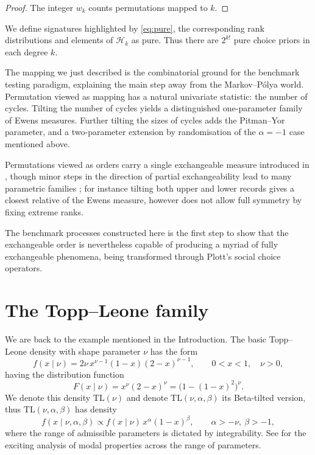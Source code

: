 \documentclass[11pt,reqno]{amsart}
\theoremstyle{definition}
\theoremstyle{remark}
\numberwithin{equation}{section}
\begin{document}
\begin{proof}
The integer \(w_k\) counts permutations mapped to \(k\).
\end{proof}

We define signatures highlighted by \eqref{eq:pure}, the corresponding rank distributions and elements of \(\mathcal{H}_k\) as pure. Thus there are \(2^{k!}\) pure choice priors in each degree \(k\).

The mapping we just described is the combinatorial ground for the benchmark testing paradigm, explaining the main step away from the Markov--P\'olya world. Permutation viewed as mapping has a natural univariate statistic: the number of cycles. Tilting the number of cycles yields a distinguished one-parameter family of Ewens measures. Further tilting the sizes of cycles adds the Pitman--Yor parameter, and a two-parameter extension by randomisation of the \(\alpha=-1\) case mentioned above.

Permutations viewed as orders carry a single exchangeable measure introduced in \cite{Rubin1966}, though minor steps in the direction of partial exchangeability lead to many parametric families \cite{Gnedin2010coherent,Gnedin2006constrained}; for instance tilting both upper and lower records gives a closest relative of the Ewens measure, however does not allow full symmetry by fixing extreme ranks.

The benchmark processes constructed here is the first step to show that the exchangeable order is nevertheless capable of producing a myriad of fully exchangeable phenomena, being transformed through Plott's social choice operators.

\section{The Topp--Leone family}

We are back to the example mentioned in the Introduction. The basic Topp--Leone density \cite{ToppLeone1955,KotzVandorp2004} with shape parameter \(\nu\) has the form
\begin{equation}\label{eq:TL}
f(x\mid\nu)=2\nu\,x^{\nu-1}(1-x)(2-x)^{\nu-1},\qquad0<x<1,\quad\nu>0,
\end{equation}
having the distribution function
\[
F(x\mid\nu)=x^\nu(2-x)^\nu=\bigl(1-(1-x)^2\bigr)^\nu.
\]
We denote this density \(\mathrm{TL}(\nu)\) and denote \(\mathrm{TL}(\nu,\alpha,\beta)\) its Beta-tilted version, thus \(\mathrm{TL}(\nu,\alpha,\beta)\) has density
\begin{equation}\label{eq:TLtilt}
f(x\mid\nu,\alpha,\beta)\propto f(x\mid\nu)\,x^\alpha(1-x)^\beta,\qquad\alpha>-\nu,\ \beta>-1,
\end{equation}
where the range of admissible parameters is dictated by integrability. See \cite{KotzVandorp2004} for the exciting analysis of modal properties across the range of parameters.
\end{document}
